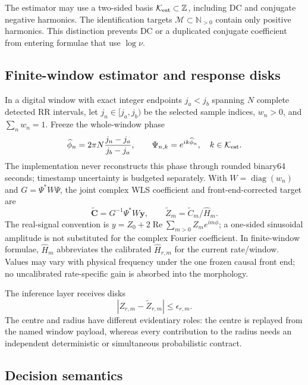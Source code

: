 \documentclass[11pt]{article}
\theoremstyle{definition}
\theoremstyle{remark}
\newcommand{\Kest}{\mathcal K_{\rm est}}
\newcommand{\Mtar}{\mathcal M}
\begin{document}
The estimator may use a two-sided basis $\Kest\subset\mathbb Z$, including DC
and conjugate negative harmonics.  The identification targets
$\Mtar\subset\mathbb N_{>0}$ contain only positive harmonics.  This distinction
prevents DC or a duplicated conjugate coefficient from entering formulae that
use $\log\nu$.

\subsection{Finite-window estimator and response disks}

In a digital window with exact integer endpoints $j_a<j_b$ spanning $N$
complete detected RR intervals, let $j_n\in[j_a,j_b)$ be the selected sample
indices, $w_n>0$, and $\sum_n w_n=1$.  Freeze the whole-window phase
\[
 \widehat\phi_n=2\pi N\frac{j_n-j_a}{j_b-j_a},\qquad
 \Psi_{n,k}=e^{ik\widehat\phi_n},\quad k\in\Kest .
\]
The implementation never reconstructs this phase through rounded binary64
seconds; timestamp uncertainty is budgeted separately.
With $W=\operatorname{diag}(w_n)$ and $G=\Psi^*W\Psi$, the joint complex WLS
coefficient and front-end-corrected target are
\begin{equation}
 \widetilde{\boldsymbol C}=G^{-1}\Psi^*W\boldsymbol y,\qquad
 \widetilde Z_m=\widetilde C_m/\widehat H_m .
 \label{eq:wls-main}
\end{equation}
The real-signal convention is
$y=Z_0+2\operatorname{Re}\sum_{m>0}Z_m e^{im\phi}$; a one-sided sinusoidal
amplitude is not substituted for the complex Fourier coefficient.
In finite-window formulae, $\widehat H_m$ abbreviates the calibrated
$\widehat H_{r,m}$ for the current rate/window.  Values may vary with physical
frequency under the one frozen causal front end; no uncalibrated rate-specific
gain is absorbed into the morphology.

The inference layer receives disks
\begin{equation}
 |Z_{r,m}-\widetilde Z_{r,m}|\le\epsilon_{r,m}.
 \label{eq:disk-main}
\end{equation}
The centre and radius have different evidentiary roles: the centre is replayed
from the named window payload, whereas every contribution to the radius needs
an independent deterministic or simultaneous probabilistic contract.

\subsection{Decision semantics}
\end{document}
